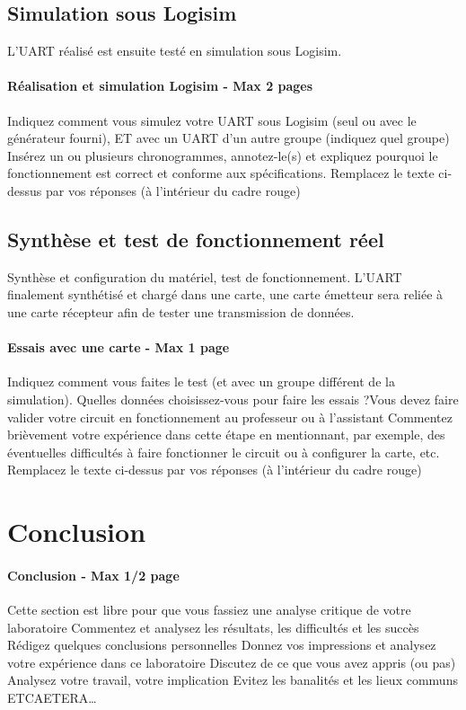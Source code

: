 \documentclass[a4paper]{article} %
\begin{document}
 \subsection{Simulation sous Logisim}
L’UART réalisé est ensuite testé en simulation sous Logisim.
\begin{tcolorbox}[colframe=Monokaimagenta,colback=white]
\paragraph{Réalisation et simulation Logisim - Max 2 pages}
Indiquez comment vous simulez votre UART sous Logisim (seul ou avec le générateur fourni), ET avec un UART d’un autre groupe (indiquez quel groupe)
Insérez un ou plusieurs chronogrammes, annotez-le(s) et expliquez pourquoi le fonctionnement est correct et conforme aux spécifications.
Remplacez le texte ci-dessus par vos réponses (à l’intérieur du cadre rouge)
\\
\end{tcolorbox}
 \subsection{Synthèse et test de fonctionnement réel}
Synthèse et configuration du matériel, test de fonctionnement.
L’UART finalement synthétisé et chargé dans une carte, une carte émetteur sera reliée à une carte récepteur afin de tester une transmission de données.
\begin{tcolorbox}[colframe=Monokaimagenta,colback=white]
\paragraph{Essais avec une carte - Max 1 page}
Indiquez comment vous faites le test (et avec un groupe différent de la simulation). Quelles données choisissez-vous pour faire les essais ?Vous devez faire valider votre circuit en fonctionnement au professeur ou à l’assistant
Commentez brièvement votre expérience dans cette étape en mentionnant, par exemple, des éventuelles difficultés à faire fonctionner le circuit ou à configurer la carte, etc.
Remplacez le texte ci-dessus par vos réponses (à l’intérieur du cadre rouge)
\\
\end{tcolorbox}
\section {Conclusion}
\begin{tcolorbox}[colframe=Monokaimagenta,colback=white]
\paragraph{Conclusion - Max 1/2 page}
Cette section est libre pour que vous fassiez une analyse critique de votre laboratoire
Commentez et analysez 
les résultats, 
les difficultés et les succès
Rédigez quelques conclusions personnelles
Donnez vos impressions et analysez votre expérience dans ce laboratoire
Discutez de ce que vous avez appris (ou pas)
Analysez votre travail, votre implication
Evitez les banalités et les lieux communs
ETCAETERA…
\\
\end{tcolorbox}
\end{document}

